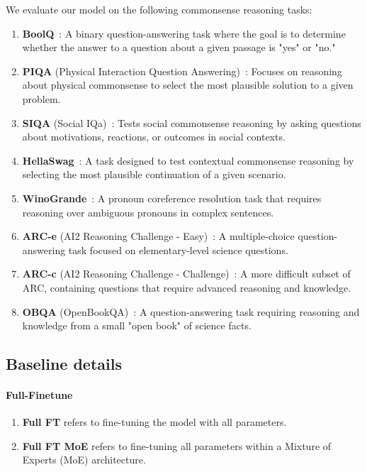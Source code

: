 We evaluate our model on the following commonsense reasoning tasks:  
\begin{enumerate}
\item \textbf{BoolQ}~\cite{clark-etal-2019-boolq}: A binary question-answering task where the goal is to determine whether the answer to a question about a given passage is "yes" or "no."  
\item \textbf{PIQA} (Physical Interaction Question Answering)~\cite{bisk2020piqa}: Focuses on reasoning about physical commonsense to select the most plausible solution to a given problem.  
\item \textbf{SIQA} (Social IQa)~\cite{sap-etal-2019-social}: Tests social commonsense reasoning by asking questions about motivations, reactions, or outcomes in social contexts.  
\item \textbf{HellaSwag}~\cite{zellers-etal-2019-hellaswag}: A task designed to test contextual commonsense reasoning by selecting the most plausible continuation of a given scenario.  
\item \textbf{WinoGrande}~\cite{sakaguchi2021winogrande}: A pronoun coreference resolution task that requires reasoning over ambiguous pronouns in complex sentences.  
\item \textbf{ARC-e} (AI2 Reasoning Challenge - Easy)~\cite{clark2018thinksolvedquestionanswering}: A multiple-choice question-answering task focused on elementary-level science questions.  
\item \textbf{ARC-c} (AI2 Reasoning Challenge - Challenge)~\cite{clark2018thinksolvedquestionanswering}: A more difficult subset of ARC, containing questions that require advanced reasoning and knowledge.  
\item \textbf{OBQA} (OpenBookQA)~\cite{mihaylov-etal-2018-suit}: A question-answering task requiring reasoning and knowledge from a small "open book" of science facts.
\end{enumerate}

\subsection{Baseline details}\label{app:baseline}

\paragraph{Full-Finetune}
\begin{enumerate}
\item \textbf{Full FT} refers to fine-tuning the model with all parameters.
\item \textbf{Full FT MoE} refers to fine-tuning all parameters within a Mixture of Experts (MoE) architecture.
\end{enumerate}

